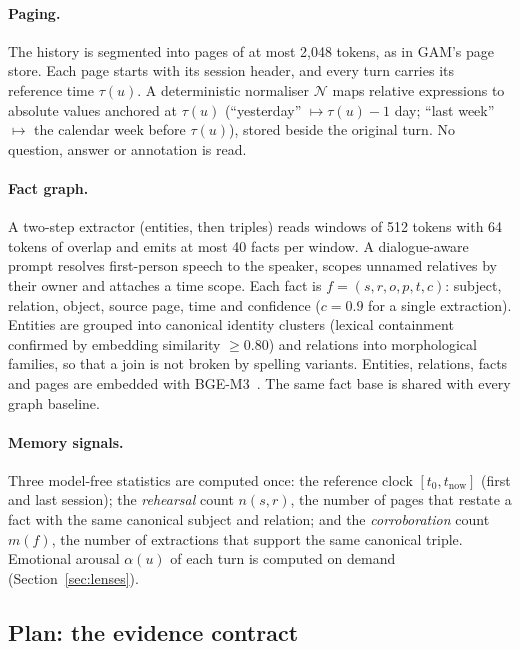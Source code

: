 \paragraph{Paging.}
The history is segmented into pages of at most 2{,}048 tokens, as in GAM's
page store. Each page starts with its session header, and every turn carries
its reference time $\tau(u)$. A deterministic normaliser $\mathcal{N}$ maps
relative expressions to absolute values anchored at $\tau(u)$
(``yesterday'' $\mapsto \tau(u)-1$ day; ``last week'' $\mapsto$ the
calendar week before $\tau(u)$), stored beside the original turn. No question,
answer or annotation is read.

\paragraph{Fact graph.}
A two-step extractor (entities, then triples) reads windows of 512 tokens with
64 tokens of overlap and emits at most 40 facts per window. A dialogue-aware
prompt resolves first-person speech to the speaker, scopes unnamed relatives
by their owner and attaches a time scope. Each fact is
$f=(s,r,o,p,t,c)$: subject, relation, object, source page, time and confidence
($c=0.9$ for a single extraction). Entities are grouped into canonical
identity clusters (lexical containment confirmed by embedding similarity
$\ge0.80$) and relations into morphological families, so that a join is not
broken by spelling variants. Entities, relations, facts and pages are
embedded with BGE-M3~\cite{chen2024bgem3}. The same fact base is shared with
every graph baseline.

\paragraph{Memory signals.}
Three model-free statistics are computed once:
the reference clock $[t_0,t_{\text{now}}]$ (first and last session);
the \emph{rehearsal} count $n(s,r)$, the number of pages that restate a fact
with the same canonical subject and relation; and the \emph{corroboration}
count $m(f)$, the number of extractions that support the same canonical
triple. Emotional arousal $\alpha(u)$ of each turn is computed on demand
(Section~\ref{sec:lenses}).

\subsection{Plan: the evidence contract}\label{sec:contract}

